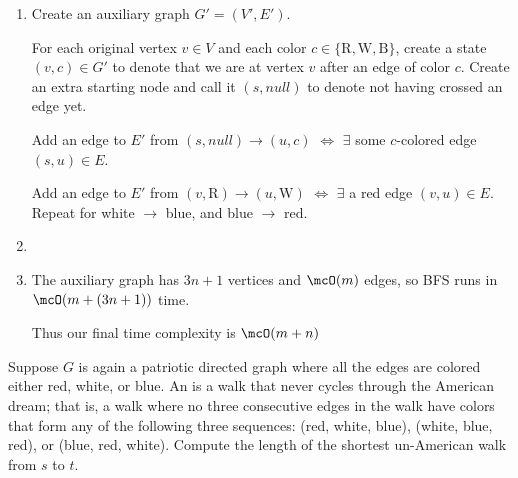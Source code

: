\documentclass{article}
\begin{document}
\begin{solution}

\begin{enumerate}[label=(\alph*)]
  \item Create an auxiliary graph \( G'=(V',E') \).

  For each original vertex \( v\in V \) and each color \( c \in \{\text{R},\text{W},\text{B}\} \), create a state \( (v,c) \in G' \) to denote that we are at vertex \( v \) after an edge of color \( c \).
  Create an extra starting node and call it \( (s, null) \) to denote not having crossed an edge yet.

  Add an edge to \( E' \) from \( (s,null) \to (u,c) \) \( \iff \) \( \exists \) some \( c \)-colored edge \( (s,u)\in E \).

  Add an edge to \( E' \) from \( (v,\mathrm{R}) \to (u,\mathrm{W}) \) \( \iff \) \( \exists \) a red edge \( (v, u)\in E \). Repeat for white \( \to \) blue, and blue \( \to \) red.

  \item {}
  \item The auxiliary graph has \( 3n + 1 \) vertices and \( \mcO(m) \) edges, so BFS runs in \( \mcO(m+(3n+1)) \) time.

  Thus our final time complexity is \( \mcO(m+n) \)
\end{enumerate}
\end{solution}
\pagebreak

\begin{subexercise} %
  Suppose \( G \) is again a patriotic directed graph where all the edges are colored either red, white, or blue.
  An  is a walk that never cycles through the American dream; that is, a walk where no three consecutive edges in the walk have colors that form any of the following three sequences: (red, white, blue), (white, blue, red), or (blue, red, white).
  Compute the length of the shortest un-American walk from \( s \) to \( t \).
\end{subexercise}
\end{document}
